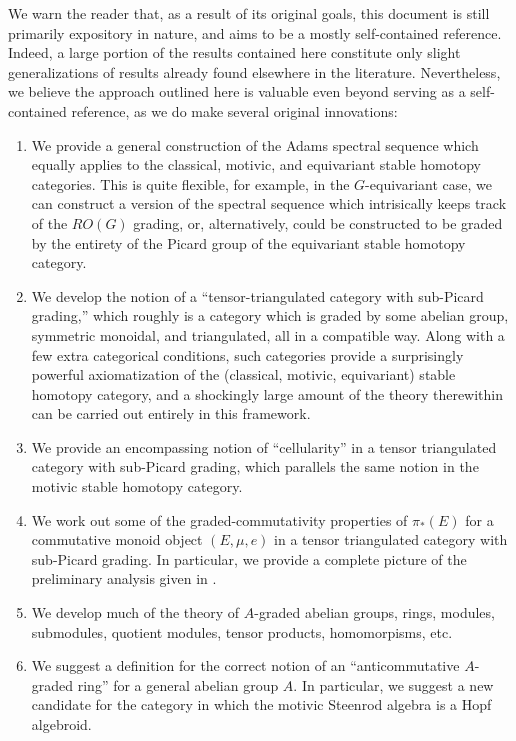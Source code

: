 \documentclass[../main.tex]{subfiles}
\begin{document}
We warn the reader that, as a result of its original goals, this document is still primarily expository in nature, and aims to be a mostly self-contained reference. Indeed, a large portion of the results contained here constitute only slight generalizations of results already found elsewhere in the literature. Nevertheless, we believe the approach outlined here is valuable even beyond serving as a self-contained reference, as we do make several original innovations:
\begin{enumerate}
    \item We provide a general construction of the Adams spectral sequence which equally applies to the classical, motivic, and equivariant stable homotopy categories. This is quite flexible, for example, in the $G$-equivariant case, we can construct a version of the spectral sequence which intrisically keeps track of the $RO(G)$ grading, or, alternatively, could be constructed to be graded by the entirety of the Picard group of the equivariant stable homotopy category.
    \item We develop the notion of a ``tensor-triangulated category with sub-Picard grading,'' which roughly is a category which is graded by some abelian group, symmetric monoidal, and triangulated, all in a compatible way. Along with a few extra categorical conditions, such categories provide a surprisingly powerful axiomatization of the (classical, motivic, equivariant) stable homotopy category, and a shockingly large amount of the theory therewithin can be carried out entirely in this framework.
    \item We provide an encompassing notion of ``cellularity'' in a tensor triangulated category with sub-Picard grading, which parallels the same notion in the motivic stable homotopy category.
    \item We work out some of the graded-commutativity properties of $\pi_*(E)$ for a commutative monoid object $(E,\mu,e)$ in a tensor triangulated category with sub-Picard grading. In particular, we provide a complete picture of the preliminary analysis given in \cite[Remark 7.2]{Dugger_2014}.
    \item We develop much of the theory of $A$-graded abelian groups, rings, modules, submodules, quotient modules, tensor products, homomorpisms, etc.
    \item We suggest a definition for the correct notion of an ``anticommutative $A$-graded ring'' for a general abelian group $A$. In particular, we suggest a new candidate for the category in which the motivic Steenrod algebra is a Hopf algebroid.
\end{enumerate}
\end{document}
